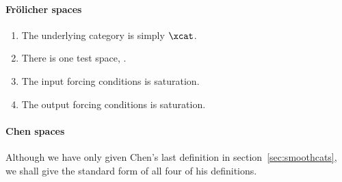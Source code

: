 \documentclass[%
12pt,%
arxiv,%
defaults
]{myclass}
\begin{document}
\paragraph{Fr\"olicher spaces}

\begin{enumerate}
\item The underlying category is simply \(\xcat\).
\item There is one test space, \R.
\item The input forcing conditions is saturation.
\item The output forcing conditions is saturation.
\end{enumerate}

\paragraph{Chen spaces}
Although we have only given Chen's last definition in section~\ref{sec:smoothcats}, we shall give the standard form of all four of his definitions.
\end{document}
